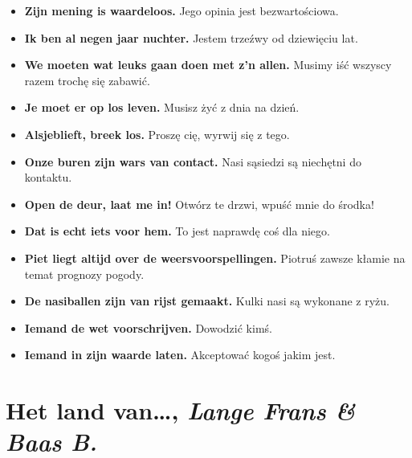 \documentclass[
]{book}
\providecommand{\tightlist}{%
  \setlength{\itemsep}{0pt}\setlength{\parskip}{0pt}}
\begin{document}
\begin{itemize}
\tightlist
\item
  \textbf{Zijn mening is waardeloos.} Jego opinia jest bezwartościowa.\\
\item
  \textbf{Ik ben al negen jaar nuchter.} Jestem trzeźwy od dziewięciu lat.\\
\item
  \textbf{We moeten wat leuks gaan doen met z'n allen.} Musimy iść wszyscy razem trochę się zabawić.\\
\item
  \textbf{Je moet er op los leven.} Musisz żyć z dnia na dzień.\\
\item
  \textbf{Alsjeblieft, breek los.} Proszę cię, wyrwij się z tego.\\
\item
  \textbf{Onze buren zijn wars van contact.} Nasi sąsiedzi są niechętni do kontaktu.\\
\item
  \textbf{Open de deur, laat me in!} Otwórz te drzwi, wpuść mnie do środka!\\
\item
  \textbf{Dat is echt iets voor hem.} To jest naprawdę coś dla niego.\\
\item
  \textbf{Piet liegt altijd over de weersvoorspellingen.} Piotruś zawsze kłamie na temat prognozy pogody.\\
\item
  \textbf{De nasiballen zijn van rijst gemaakt.} Kulki nasi są wykonane z ryżu.\\
\item
  \textbf{Iemand de wet voorschrijven.} Dowodzić kimś.\\
\item
  \textbf{Iemand in zijn waarde laten.} Akceptować kogoś jakim jest.
\end{itemize}

\hypertarget{Het-land-van}{%
\section{\texorpdfstring{Het land van\ldots, \emph{Lange Frans \& Baas B.}}{Het land van\ldots, Lange Frans \& Baas B.}}\label{Het-land-van}}
\end{document}
